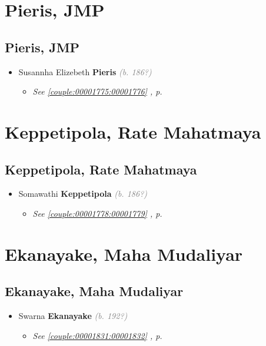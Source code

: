 \documentclass[10pt, openany]{book}
\begin{document}
\part{Pieris, JMP}
\chapter{Pieris, JMP}
\label{00001777}
\textcolor{slmaroon}{\textit{}}
\begin{itemize}
\item{Susannha Elizebeth \textbf{Pieris} \textcolor{gray}{\textit{(b. 186?)}}
\begin{itemize}
\item{\textcolor{slteal}{\textit{See  \autoref{couple:00001775:00001776} \textit{, p. \pageref{couple:00001775:00001776} }}}}
\end{itemize}
  }
\end{itemize}
 
\part{Keppetipola, Rate Mahatmaya}
\chapter{Keppetipola, Rate Mahatmaya}
\label{00001780}
\textcolor{slmaroon}{\textit{}}
\begin{itemize}
\item{Somawathi \textbf{Keppetipola} \textcolor{gray}{\textit{(b. 186?)}}
\begin{itemize}
\item{\textcolor{slteal}{\textit{See  \autoref{couple:00001778:00001779} \textit{, p. \pageref{couple:00001778:00001779} }}}}
\end{itemize}
 }
\end{itemize}
  
\part{Ekanayake, Maha Mudaliyar}
\chapter{Ekanayake, Maha Mudaliyar}
\label{00001833}
\textcolor{slmaroon}{\textit{}}
\begin{itemize}
\item{Swarna \textbf{Ekanayake} \textcolor{gray}{\textit{(b. 192?)}}
\begin{itemize}
\item{\textcolor{slteal}{\textit{See  \autoref{couple:00001831:00001832} \textit{, p. \pageref{couple:00001831:00001832} }}}}
\end{itemize}
 }
\end{itemize}
  
\end{document}
